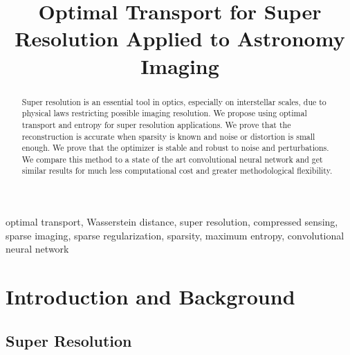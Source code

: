\documentclass[conference]{IEEEtran}
\begin{document}

\title{Optimal Transport for Super Resolution Applied to Astronomy Imaging}

\author{
\and
{}
}

\maketitle

\begin{abstract}
Super resolution is an essential tool in optics, especially on interstellar scales, due to physical laws restricting possible imaging resolution. We propose using optimal transport and entropy for super resolution applications. We prove that the reconstruction is accurate when sparsity is known and noise or distortion is small enough. We prove that the optimizer is stable and robust to noise and perturbations. We compare this method to a state of the art convolutional neural network and get similar results for much less computational cost and greater methodological flexibility.  
\end{abstract}

\begin{IEEEkeywords}
optimal transport, Wasserstein distance, super resolution, compressed sensing, sparse imaging, sparse regularization, sparsity, maximum entropy, convolutional neural network
\end{IEEEkeywords}




\section{Introduction and Background}

\subsection{Super Resolution}
\end{document}
